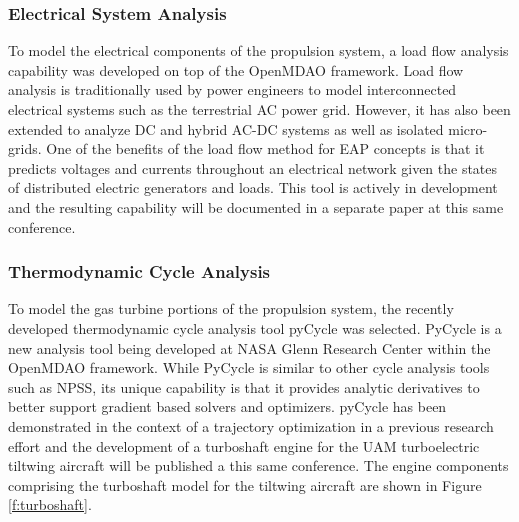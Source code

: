 \subsubsection{Electrical System Analysis} %



To model the electrical components of the propulsion system, a load flow analysis capability was developed on top of the OpenMDAO framework.
Load flow analysis is traditionally used by power engineers to model interconnected electrical systems such as the terrestrial AC power grid.  
However, it has also been extended to analyze DC and hybrid AC-DC systems\cite{ahmed2018generalized} as well as isolated micro-grids.
One of the benefits of the load flow method for EAP concepts is that it predicts voltages and currents throughout an electrical network given the states of distributed electric generators and loads.
This tool is actively in development and the resulting capability will be documented in a separate paper at this same conference.\cite{hendricks2019load}

\subsubsection{Thermodynamic Cycle Analysis} %
To model the gas turbine portions of the propulsion system, the recently developed thermodynamic cycle analysis tool pyCycle was selected.\cite{gray2017chemical,hearn2016optimization}
PyCycle is a new analysis tool being developed at NASA Glenn Research Center within the OpenMDAO framework.
While PyCycle is similar to other cycle analysis tools such as NPSS, its unique capability is that it provides analytic derivatives to better support gradient based solvers and optimizers.  
pyCycle has been demonstrated in the context of a trajectory optimization in a previous research effort\cite{hendricks2017simultaneous} and the development of a turboshaft engine for the UAM turboelectric tiltwing aircraft will be published a this same conference.\cite{chapman2018multi}
The engine components comprising the turboshaft model for the tiltwing aircraft are shown in Figure \ref{f:turboshaft}.


